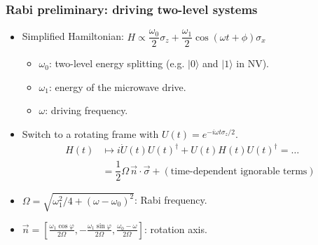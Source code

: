 \documentclass{beamer}
\begin{document}
\begin{frame}
    \frametitle{Rabi preliminary: driving two-level systems}
    \begin{itemize}
        \item Simplified Hamiltonian: $H \propto \dfrac{\omega_0}{2} \sigma_z + \dfrac{\omega_1}{2} \cos(\omega t + \phi) \sigma_x$
        \begin{itemize}
            \item $\omega_0$: two-level energy splitting (e.g. $|0\rangle$ and $|1\rangle$ in NV). 
            \item $\omega_1$: energy of the microwave drive. 
            \item $\omega$: driving frequency. 
        \end{itemize}

        \item Switch to a rotating frame with $U(t) = e^{-i\omega t \sigma_z/2}$. 
        \begin{align*}
            H(t) 
            &\mapsto i \dot U(t)U(t)^\dag + U(t) H(t) U(t)^\dag = \dots \\ 
            &= \dfrac 1 2 \Omega \, \vec n\cdot \vec \sigma + (\text{time-dependent ignorable terms})
        \end{align*}
        \item $\Omega = \sqrt{\omega_1^2/4 + (\omega - \omega_0)^2}$: Rabi frequency. 
        \item $\vec{n} = \left[\frac{\omega_1 \cos \varphi}{2\Omega}, -\frac{\omega_1 \sin \varphi}{2\Omega}, \frac{\omega_0-\omega}{2\Omega}\right]$: rotation axis. 
    \end{itemize}
\end{frame}
\end{document}
